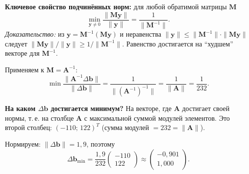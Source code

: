 \documentclass{article}
\begin{document}
\textbf{Ключевое свойство подчинённых норм:} для любой обратимой матрицы $\mathbf{M}$
\begin{equation}
\min_{\mathbf{y} \neq 0} \frac{\|\mathbf{M}\mathbf{y}\|}{\|\mathbf{y}\|} = \frac{1}{\|\mathbf{M}^{-1}\|}.
\end{equation}
\textit{Доказательство:} из $\mathbf{y} = \mathbf{M}^{-1}(\mathbf{M}\mathbf{y})$ и неравенства $\|\mathbf{y}\| \leqslant \|\mathbf{M}^{-1}\| \cdot \|\mathbf{M}\mathbf{y}\|$ следует $\|\mathbf{M}\mathbf{y}\|/\|\mathbf{y}\| \geqslant 1/\|\mathbf{M}^{-1}\|$. Равенство достигается на ``худшем'' векторе для $\mathbf{M}^{-1}$.

Применяем к $\mathbf{M} = \mathbf{A}^{-1}$:
\begin{equation}
\min \frac{\|\mathbf{A}^{-1}\Delta\mathbf{b}\|}{\|\Delta\mathbf{b}\|} = \frac{1}{\|(\mathbf{A}^{-1})^{-1}\|} = \frac{1}{\|\mathbf{A}\|} = \frac{1}{232}.
\end{equation}

\textbf{На каком $\Delta\mathbf{b}$ достигается минимум?} На векторе, где $\mathbf{A}$ достигает своей нормы, т.\,е. на столбце $\mathbf{A}$ с максимальной суммой модулей элементов. Это второй столбец: $(-110;\, 122)^T$ (сумма модулей $= 232 = \|\mathbf{A}\|$).

Нормируем: $\|\Delta\mathbf{b}\| = 1{,}9$, поэтому
\begin{equation}
\Delta\mathbf{b}_{\min} = \frac{1{,}9}{232} \begin{pmatrix} -110 \\ 122 \end{pmatrix} \approx \begin{pmatrix} -0{,}901 \\ 1{,}000 \end{pmatrix}.
\end{equation}
\end{document}

